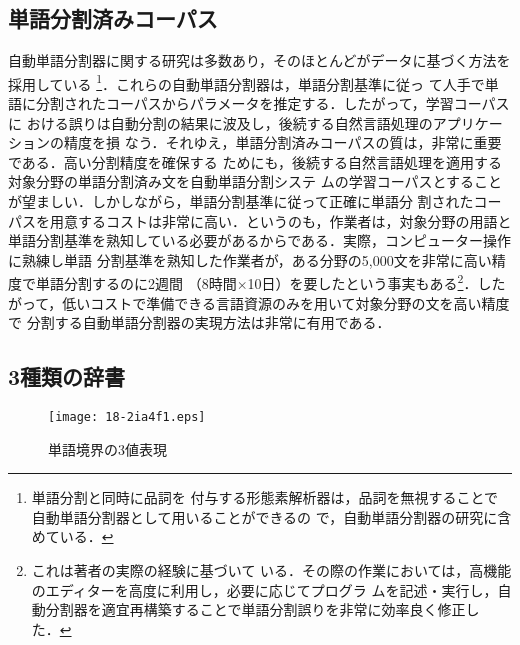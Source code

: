 \documentclass[japanese]{jnlp_JS2.0}
\begin{document}
\subsection{単語分割済みコーパス}
\label{section:WSC}

自動単語分割器に関する研究は多数あり，そのほとんどがデータに基づく方法を採用している
\cite{統計的言語モデルとN-best探索を用いた日本語形態素解析法,形態素クラスタリングによる形態素解析精度の向上,A.Stochastic.Finite-State.Word-Segmentation.Algorithm.for.Chinese,最大エントロピーモデルに基づく形態素解析.--未知語の問題の解決策--,Conditional.Random.Fields.を用いた日本語形態素解析}\footnote{単語分割と同時に品詞を
付与する形態素解析器は，品詞を無視することで自動単語分割器として用いることができるの
で，自動単語分割器の研究に含めている．}．これらの自動単語分割器は，単語分割基準に従っ
て人手で単語に分割されたコーパスからパラメータを推定する．したがって，学習コーパスに
おける誤りは自動分割の結果に波及し，後続する自然言語処理のアプリケーションの精度を損
なう．それゆえ，単語分割済みコーパスの質は，非常に重要である．高い分割精度を確保する
ためにも，後続する自然言語処理を適用する対象分野の単語分割済み文を自動単語分割システ
ムの学習コーパスとすることが望ましい．しかしながら，単語分割基準に従って正確に単語分
割されたコーパスを用意するコストは非常に高い．というのも，作業者は，対象分野の用語と
単語分割基準を熟知している必要があるからである．実際，コンピューター操作に熟練し単語
分割基準を熟知した作業者が，ある分野の5,000文を非常に高い精度で単語分割するのに2週間
（8時間$\times$10日）を要したという事実もある\footnote{これは著者の実際の経験に基づいて
いる．その際の作業においては，高機能のエディターを高度に利用し，必要に応じてプログラ
ムを記述・実行し，自動分割器を適宜再構築することで単語分割誤りを非常に効率良く修正し
た．}．したがって，低いコストで準備できる言語資源のみを用いて対象分野の文を高い精度で
分割する自動単語分割器の実現方法は非常に有用である．


\subsection{3種類の辞書}

\begin{figure}[t]
  \begin{center}
\texttt{[image: 18-2ia4f1.eps]}
  \end{center}
  \caption{単語境界の3値表現}
  \label{figure:3-valued}
\vspace{-0.5\baselineskip}
\end{figure}
\end{document}
